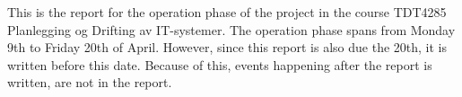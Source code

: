 This is the report for the operation phase of the project in the course TDT4285 Planlegging og Drifting av IT-systemer. The operation phase spans from Monday 9th to Friday 20th of April. However, since this report is also due the 20th, it is written before this date. Because of this, events happening after the report is written, are not in the report. 